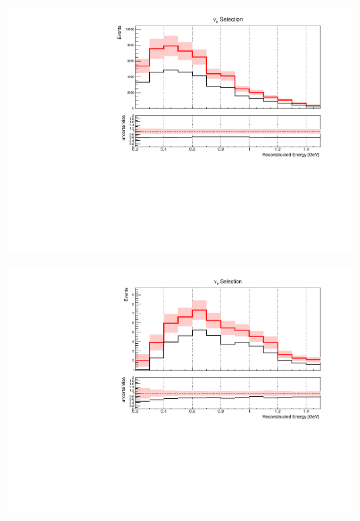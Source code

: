 \documentclass[a4paper]{article}
\begin{document}
\begin{figure}[H]
    \centering
         \begin{subfigure}[b]{0.45\textwidth}
        \centering
        \includegraphics[width=\textwidth]{ConstraintClosureTests/2sigma_down/nuenumu_reco_e_H0_dataconstraint_All_GenieAll_Genie_numu_before_data_constraint.pdf}
        \end{subfigure}  
         \begin{subfigure}[b]{0.45\textwidth}
        \centering
        \includegraphics[width=\textwidth]{ConstraintClosureTests/2sigma_down/nuenumu_reco_e_H0_dataconstraint_All_GenieAll_Genie_nue_before_data_constraint.pdf}
        \end{subfigure}
         \begin{subfigure}[b]{0.45\textwidth}
        \centering

\end{subfigure}
\end{figure}
\end{document}
